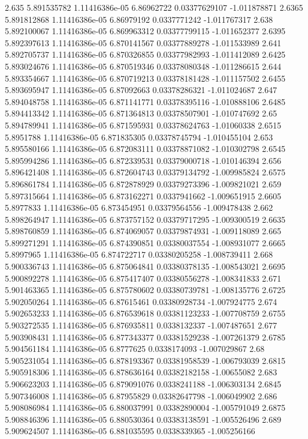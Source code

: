 {2.635 5.891535782 1.11416386e-05 6.86962722 0.03377629107 -1.011878871
2.6365 5.891812868 1.11416386e-05 6.86979192 0.0337771242 -1.011767317
2.638 5.892100067 1.11416386e-05 6.869963312 0.03377799115 -1.011652377
2.6395 5.892397613 1.11416386e-05 6.870141567 0.03377889278 -1.011533989
2.641 5.892705737 1.11416386e-05 6.870326855 0.03377982993 -1.011412089
2.6425 5.893024676 1.11416386e-05 6.870519346 0.03378080348 -1.011286615
2.644 5.893354667 1.11416386e-05 6.870719213 0.03378181428 -1.011157502
2.6455 5.893695947 1.11416386e-05 6.87092663 0.03378286321 -1.011024687
2.647 5.894048758 1.11416386e-05 6.871141771 0.03378395116 -1.010888106
2.6485 5.894413342 1.11416386e-05 6.871364813 0.03378507901 -1.010747692
2.65 5.894789941 1.11416386e-05 6.871595931 0.03378624763 -1.01060338
2.6515 5.8951788 1.11416386e-05 6.871835305 0.03378745794 -1.010455104
2.653 5.895580166 1.11416386e-05 6.872083111 0.03378871082 -1.010302798
2.6545 5.895994286 1.11416386e-05 6.872339531 0.03379000718 -1.010146394
2.656 5.896421408 1.11416386e-05 6.872604743 0.03379134792 -1.009985824
2.6575 5.896861784 1.11416386e-05 6.872878929 0.03379273396 -1.009821021
2.659 5.897315664 1.11416386e-05 6.873162271 0.0337941662 -1.009651915
2.6605 5.8977833 1.11416386e-05 6.873454951 0.03379564556 -1.009478438
2.662 5.898264947 1.11416386e-05 6.873757152 0.03379717295 -1.009300519
2.6635 5.898760859 1.11416386e-05 6.874069057 0.03379874931 -1.009118089
2.665 5.899271291 1.11416386e-05 6.874390851 0.03380037554 -1.008931077
2.6665 5.8997965 1.11416386e-05 6.874722717 0.03380205258 -1.008739411
2.668 5.900336743 1.11416386e-05 6.875064841 0.03380378135 -1.008543021
2.6695 5.900892278 1.11416386e-05 6.875417407 0.03380556278 -1.008341833
2.671 5.901463365 1.11416386e-05 6.875780602 0.03380739781 -1.008135776
2.6725 5.902050264 1.11416386e-05 6.87615461 0.03380928734 -1.007924775
2.674 5.902653233 1.11416386e-05 6.876539618 0.03381123233 -1.007708759
2.6755 5.903272535 1.11416386e-05 6.876935811 0.0338132337 -1.007487651
2.677 5.903908431 1.11416386e-05 6.877343377 0.03381529238 -1.007261379
2.6785 5.904561184 1.11416386e-05 6.8777625 0.0338174093 -1.007029867
2.68 5.905231054 1.11416386e-05 6.878193367 0.03381958539 -1.006793039
2.6815 5.905918306 1.11416386e-05 6.878636164 0.03382182158 -1.00655082
2.683 5.906623203 1.11416386e-05 6.879091076 0.0338241188 -1.006303134
2.6845 5.907346008 1.11416386e-05 6.87955829 0.03382647798 -1.006049902
2.686 5.908086984 1.11416386e-05 6.880037991 0.03382890004 -1.005791049
2.6875 5.908846396 1.11416386e-05 6.880530364 0.03383138591 -1.005526496
2.689 5.909624507 1.11416386e-05 6.881035595 0.0338339365 -1.005256166
}
